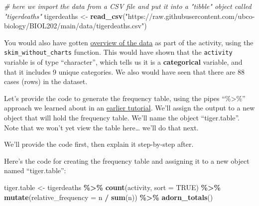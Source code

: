 \documentclass[
]{book}
\newenvironment{Shaded}{\begin{snugshade}}{\end{snugshade}}
\newcommand{\AttributeTok}[1]{\textcolor[rgb]{0.13,0.29,0.53}{#1}}
\newcommand{\CommentTok}[1]{\textcolor[rgb]{0.56,0.35,0.01}{\textit{#1}}}
\newcommand{\ConstantTok}[1]{\textcolor[rgb]{0.56,0.35,0.01}{#1}}
\newcommand{\FunctionTok}[1]{\textcolor[rgb]{0.13,0.29,0.53}{\textbf{#1}}}
\newcommand{\NormalTok}[1]{#1}
\newcommand{\OtherTok}[1]{\textcolor[rgb]{0.56,0.35,0.01}{#1}}
\newcommand{\SpecialCharTok}[1]{\textcolor[rgb]{0.81,0.36,0.00}{\textbf{#1}}}
\newcommand{\StringTok}[1]{\textcolor[rgb]{0.31,0.60,0.02}{#1}}
\begin{document}
\begin{Shaded}
\begin{Highlighting}[]
\CommentTok{\# here we import the data from a CSV file and put it into a "tibble" object called "tigerdeaths"}
\NormalTok{tigerdeaths }\OtherTok{\textless{}{-}} \FunctionTok{read\_csv}\NormalTok{(}\StringTok{"https://raw.githubusercontent.com/ubco{-}biology/BIOL202/main/data/tigerdeaths.csv"}\NormalTok{)}
\end{Highlighting}
\end{Shaded}

You would also have gotten \hyperref[vis_data_overview]{overview of the data} as part of the activity, using the \texttt{skim\_without\_charts} function. This would have shown that the \texttt{activity} variable is of type ``character'', which tells us it is a \textbf{categorical} variable, and that it includes 9 unique categories. We also would have seen that there are 88 cases (rows) in the dataset.

Let's provide the code to generate the frequency table, using the pipes ``\%\textgreater\%'' approach we learned about in an \hyperref[import_csv_local]{earlier tutorial}. We'll assign the output to a new object that will hold the frequency table. We'll name the object ``tiger.table''. Note that we won't yet view the table here\ldots{} we'll do that next.

We'll provide the code first, then explain it step-by-step after.

Here's the code for creating the frequency table and assigning it to a new object named ``tiger.table'':

\begin{Shaded}
\begin{Highlighting}[]
\NormalTok{tiger.table }\OtherTok{\textless{}{-}}\NormalTok{ tigerdeaths }\SpecialCharTok{\%\textgreater{}\%}
  \FunctionTok{count}\NormalTok{(activity, }\AttributeTok{sort =} \ConstantTok{TRUE}\NormalTok{) }\SpecialCharTok{\%\textgreater{}\%} 
  \FunctionTok{mutate}\NormalTok{(}\AttributeTok{relative\_frequency =}\NormalTok{ n }\SpecialCharTok{/} \FunctionTok{sum}\NormalTok{(n)) }\SpecialCharTok{\%\textgreater{}\%}
  \FunctionTok{adorn\_totals}\NormalTok{()}
\end{Highlighting}
\end{Shaded}
\end{document}
